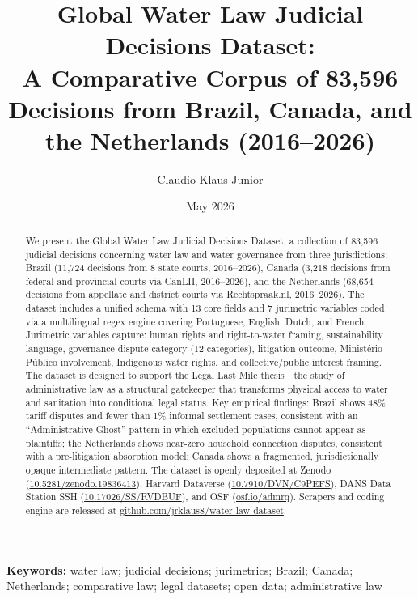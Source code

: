 \documentclass[12pt]{article}
\title{\textbf{Global Water Law Judicial Decisions Dataset}:\\
A Comparative Corpus of 83,596 Decisions from Brazil, Canada, and the Netherlands (2016--2026)}
\author{Claudio Klaus Junior}
\date{May 2026}
\begin{document}
\maketitle

\begin{abstract}
We present the Global Water Law Judicial Decisions Dataset, a collection of 83,596 judicial decisions concerning water law and water governance from three jurisdictions: Brazil (11,724 decisions from 8 state courts, 2016--2026), Canada (3,218 decisions from federal and provincial courts via CanLII, 2016--2026), and the Netherlands (68,654 decisions from appellate and district courts via Rechtspraak.nl, 2016--2026). The dataset includes a unified schema with 13 core fields and 7 jurimetric variables coded via a multilingual regex engine covering Portuguese, English, Dutch, and French. Jurimetric variables capture: human rights and right-to-water framing, sustainability language, governance dispute category (12 categories), litigation outcome, Ministério Público involvement, Indigenous water rights, and collective/public interest framing. The dataset is designed to support the Legal Last Mile thesis—the study of administrative law as a structural gatekeeper that transforms physical access to water and sanitation into conditional legal status. Key empirical findings: Brazil shows 48\% tariff disputes and fewer than 1\% informal settlement cases, consistent with an ``Administrative Ghost'' pattern in which excluded populations cannot appear as plaintiffs; the Netherlands shows near-zero household connection disputes, consistent with a pre-litigation absorption model; Canada shows a fragmented, jurisdictionally opaque intermediate pattern. The dataset is openly deposited at Zenodo (\href{https://doi.org/10.5281/zenodo.19836413}{10.5281/zenodo.19836413}), Harvard Dataverse (\href{https://doi.org/10.7910/DVN/C9PEFS}{10.7910/DVN/C9PEFS}), DANS Data Station SSH (\href{https://doi.org/10.17026/SS/RVDBUF}{10.17026/SS/RVDBUF}), and OSF (\href{https://osf.io/admrq}{osf.io/admrq}). Scrapers and coding engine are released at \href{https://github.com/jrklaus8/water-law-dataset}{github.com/jrklaus8/water-law-dataset}.
\end{abstract}

\textbf{Keywords:} water law; judicial decisions; jurimetrics; Brazil; Canada; Netherlands; comparative law; legal datasets; open data; administrative law

\tableofcontents
\newpage

\end{document}
